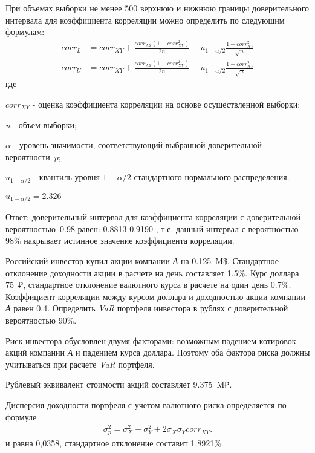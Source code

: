 \documentclass[12pt, table, twoside, a4paper]{exam}
\begin{document}
\begin{questions}
	\begin{solution}[6em]
		
		\raggedright
		При объемах выборки не менее 500 верхнюю и нижнюю границы доверительного интервала для коэффициента корреляции можно определить по следующим формулам:
		\begin{align}
		corr_L&=corr_{XY}+\frac{corr_{XY}(1-corr_{XY}^2)}{2n}-u_{1-\alpha/2}\frac{1-corr_{XY}^2}{\sqrt{n}}\\
		corr_U&=corr_{XY}+\frac{corr_{XY}(1-corr_{XY}^2)}{2n}+u_{1-\alpha/2}\frac{1-corr_{XY}^2}{\sqrt{n}}
		\end{align}
		где
		
		$corr_{XY}$ - оценка коэффициента корреляции на основе осуществленной выборки;
		
		\textit{n} - объем выборки;
		
		$\alpha$ - уровень значимости, соответствующий выбранной доверительной вероятности~$p$;
		
		$u_{1-\alpha/2}$ - квантиль уровня $1-\alpha/2$ стандартного нормального распределения.
		
		$u_{1-\alpha/2}=2.326$	
		
		Ответ: доверительный интервал для коэффициента корреляции с доверительной вероятностью~0.98 равен: 0.8813 0.9190
		, т.е. данный интервал с вероятностью 98\% накрывает истинное значение коэффициента корреляции.	
	\end{solution}
	
	\question[10] Российский инвестор купил акции компании \textit{А} на 0.125~M\$. Стандартное отклонение доходности акции в расчете на день составляет 1.5\%. Курс доллара 75~₽, стандартное отклонение валютного курса в расчете на один день 0.7\%. Коэффициент корреляции между курсом доллара и доходностью акции компании \textit{А} равен 0.4. Определить \textit{VaR }портфеля инвестора в рублях с доверительной вероятностью 90\%.
	
	\begin{solution}[6em]
		
		\raggedright
		Риск инвестора обусловлен двумя факторами: возможным падением котировок акций компании \textit{А} и падением курса доллара. Поэтому оба фактора риска должны учитываться при расчете \textit{VaR }портфеля.
		
		Рублевый эквивалент стоимости акций составляет 9.375~M₽.
		
		Дисперсия доходности портфеля с учетом валютного риска определяется по формуле 
		\begin{align}
		\sigma_p^2=\sigma_X^2+\sigma_Y^2+2\sigma_X\sigma_Y corr_{XY}.
		\end{align}
		и равна 0,0358, стандартное отклонение составит 1,8921\%.
		

\end{solution}
\end{questions}
\end{document}
